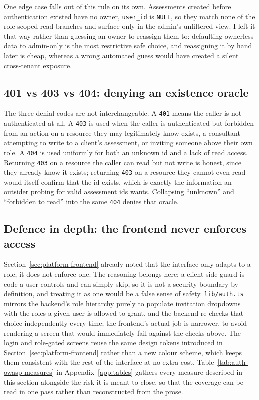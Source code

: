 One edge case falls out of this rule on its own. Assessments created before authentication existed have no owner, \texttt{user\_\allowbreak id} is \texttt{NULL}, so they match none of the role-scoped read branches and surface only in the admin's unfiltered view. I left it that way rather than guessing an owner to reassign them to: defaulting ownerless data to admin-only is the most restrictive safe choice, and reassigning it by hand later is cheap, whereas a wrong automated guess would have created a silent cross-tenant exposure.

\subsection{401 vs 403 vs 404: denying an existence oracle}

The three denial codes are not interchangeable. A \texttt{401} means the caller is not authenticated at all. A \texttt{403} is used when the caller is authenticated but forbidden from an action on a resource they may legitimately know exists, a consultant attempting to write to a client's assessment, or inviting someone above their own role. A \texttt{404} is used uniformly for both an unknown id and a lack of read access. Returning \texttt{403} on a resource the caller can read but not write is honest, since they already know it exists; returning \texttt{403} on a resource they cannot even read would itself confirm that the id exists, which is exactly the information an outsider probing for valid assessment ids wants. Collapsing ``unknown'' and ``forbidden to read'' into the same \texttt{404} denies that oracle.

\subsection{Defence in depth: the frontend never enforces access}

Section~\ref{sec:platform-frontend} already noted that the interface only adapts to a role, it does not enforce one. The reasoning belongs here: a client-side guard is code a user controls and can simply skip, so it is not a security boundary by definition, and treating it as one would be a false sense of safety. \texttt{lib/\allowbreak auth.\allowbreak ts} mirrors the backend's role hierarchy purely to populate invitation dropdowns with the roles a given user is allowed to grant, and the backend re-checks that choice independently every time; the frontend's actual job is narrower, to avoid rendering a screen that would immediately fail against the checks above. The login and role-gated screens reuse the same design tokens introduced in Section~\ref{sec:platform-frontend} rather than a new colour scheme, which keeps them consistent with the rest of the interface at no extra cost. Table~\ref{tab:auth-owasp-measures} in Appendix~\ref{app:tables} gathers every measure described in this section alongside the risk it is meant to close, so that the coverage can be read in one pass rather than reconstructed from the prose.

